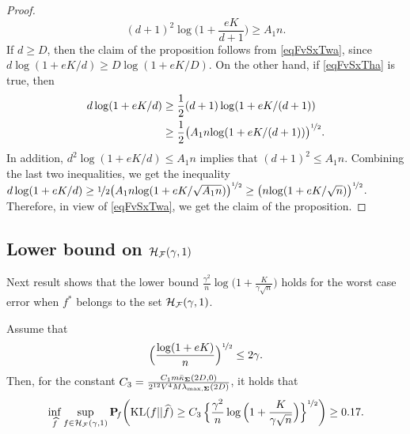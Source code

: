 \begin{proof}
	\begin{equation}\label{eqFvSxTha}
	(d+1)^2\log\Big(1+\frac{e  K}{d+1}\Big)\ge A_1 n.
	\end{equation}
	If $d\ge D$, then the claim of the proposition follows from \eqref{eqFvSxTwa}, since
	$d\log(1+eK/d)\ge D\log(1+eK/D)$. On the other hand, if \eqref{eqFvSxTha} is true, then
	\begin{align}
	d\log(1+eK/d) 
	&\ge \frac12 (d+1)\log(1+eK/(d+1))\nonumber \\
	&\ge \frac12 \big({A_1 n}{\log(1+eK/(d+1))}\big)^{\nicefrac12}.
	\end{align}
	In addition, $d^2\log(1+eK/d)\le A_1 n$ implies that $(d+1)^2 \le A_1 n$. Combining the last
	two inequalities, we get the inequality $d\log(1+eK/d)  \ge \nicefrac12 \big({A_1 n}{\log(1+eK/\sqrt{A_1n})}\big)^{\nicefrac12}\ge  \big({n}{\log(1+eK/\sqrt{n})}\big)^{\nicefrac12}$. 
	Therefore, in view of \eqref{eqFvSxTwa}, we get the claim of the proposition.
\end{proof}


\subsection{Lower bound on $\mathcal H_\mathcal F(\gamma,1)$} %

Next result shows that the lower bound ${\frac{\gamma^2}n\log\big(1+\frac{K}{\gamma\sqrt{n}}\big)}$ 
holds for the worst case error when $f^*$ belongs to the set $\mathcal H_\mathcal F(\gamma,1)$. 
\begin{proposition}\label{prop:lower:2}
	Assume that
	\begin{equation}
	\Big(\frac{\log(1+eK)}{n}\Big)^{\nicefrac12}\le 2\gamma.
	\end{equation}
	Then, for the constant $C_3 =
	\frac{C_1 m \bar\kappa_{\boldsymbol\Sigma}(2D,0) }{2^{12}V^4 M\lambda_{\max,\boldsymbol\Sigma}(2D)}$,
	it holds that
	\begin{equation}
	\inf_{\widehat f}\sup_{f \in \mathcal H_\mathcal F(\gamma,1)}\mathbf P\!_{f}\bigg({\rm KL}(f||\widehat f)\geq
	C_3\,\Big\{{\frac{\gamma^2}n\log\Big(1+\frac{K}{\gamma\sqrt{n}}\Big)}\Big\}^{\nicefrac12}\bigg)\geq 0.17.
	\end{equation}
\end{proposition}



